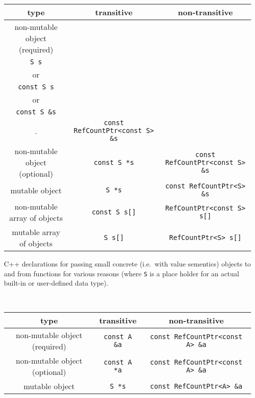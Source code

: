 \begin{table}
%
\begin{minipage}{\textwidth}
\begin{tabular}{|c|c|c|}
\hline
type
& transitive
& non-transitive \\
\hline
non-mutable object (required)
& \begin{minipage}{12ex}
    \begin{center}
    {\tiny .}\\
    \texttt{S s} \\
    or \\
    \texttt{const S s} \\
    or \\
    \texttt{const S \&s} \\
    {\tiny .}
    \end{center}
  \end{minipage}
& \texttt{const RefCountPtr<const S> \&s} \\
\hline
non-mutable object (optional)
& \texttt{const S *s}
& \texttt{const RefCountPtr<const S> \&s} \\
\hline
mutable object
& \texttt{S *s}
& \texttt{const RefCountPtr<S> \&s} \\
\hline
non-mutable array of objects
& \texttt{const S s[]}
& \texttt{RefCountPtr<const S> s[]} \\
\hline
mutable array of objects
& \texttt{S s[]}
& \texttt{RefCountPtr<S> s[]} \\
\hline
\end{tabular}
\begin{center}
C++ declarations for passing small concrete (i.e.~with value
sementics) objects to and from functions for various reasons (where
\texttt{S} is a place holder for an actual built-in or user-defined
data type).
\end{center}
\end{minipage}
%
\\[5ex]
%
\begin{minipage}{\textwidth}
\begin{tabular}{|c|c|c|}
\hline
type
& transitive
& non-transitive \\
\hline
non-mutable object (required)
& \texttt{const A \&a}
& \texttt{const RefCountPtr<const A> \&a} \\
\hline
non-mutable object (optional)
& \texttt{const A *a}
& \texttt{const RefCountPtr<const A> \&a} \\
\hline
mutable object
& \texttt{S *s}
& \texttt{const RefCountPtr<A> \&a} \\

\end{tabular}
\end{minipage}
\end{table}
